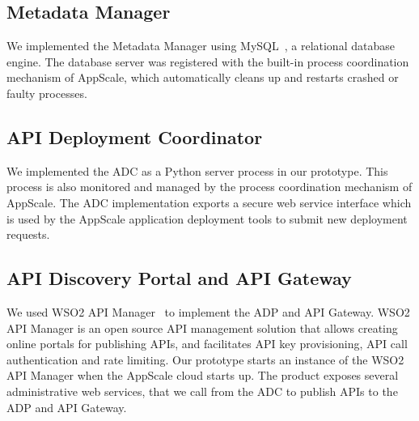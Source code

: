 \subsection{Metadata Manager} 
We implemented the Metadata Manager using MySQL~\cite{mysql},
a relational database engine.  The database server was registered with the
built-in process coordination mechanism of AppScale, which automatically
cleans up and restarts crashed or faulty processes. 

\subsection{API Deployment Coordinator}

We implemented the ADC as a Python server process in our prototype. This
process is also monitored and managed by the process coordination mechanism of
AppScale. The ADC implementation exports a secure web service interface which
is used by the AppScale application deployment tools to submit new deployment
requests. 


\subsection{API Discovery Portal and API Gateway}

We used WSO2 API Manager~\cite{wso2am} to implement the ADP and API Gateway.
WSO2 API Manager is an open source API management solution that allows
creating online portals for publishing APIs, and facilitates API key
provisioning, API call authentication and rate limiting.  Our prototype starts
an instance of the WSO2 API Manager when the AppScale cloud starts up. The
product exposes several administrative web services, that we call from the ADC
to publish APIs to the ADP and API Gateway. 
